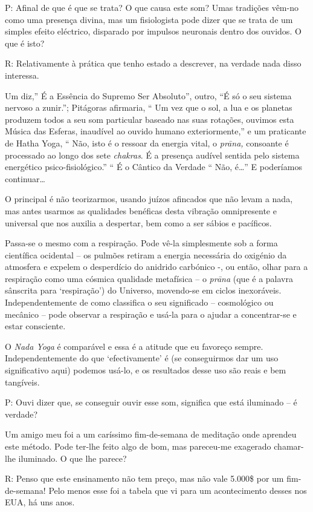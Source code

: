 P: Afinal de que é que se trata? O que causa este som? Umas tradições
vêm-no como uma presença divina, mas um fisiologista pode dizer que se
trata de um simples efeito eléctrico, disparado por impulsos neuronais
dentro dos ouvidos. O que é isto?

R: Relativamente à prática que tenho estado a descrever, na verdade nada
disso interessa.

Um diz,'' É a Essência do Supremo Ser Absoluto'', outro, ``É só o seu
sistema nervoso a zunir.''; Pitágoras afirmaria, `` Um vez que o sol, a
lua e os planetas produzem todos a seu som particular baseado nas suas
rotações, ouvimos esta Música das Esferas, inaudível ao ouvido humano
exteriormente,'' e um praticante de Hatha Yoga, `` Não, isto é o ressoar
da energia vital, o \emph{prāna,} consoante é processado ao longo dos
sete \emph{chakras}. É a presença audível sentida pelo sistema
energético psico-fisiológico.'' `` É o Cântico da Verdade `` Não,
é\ldots{}'' E poderíamos continuar\ldots{}

O principal é não teorizarmos, usando juízos afincados que não levam a
nada, mas antes usarmos as qualidades benéficas desta vibração
omnipresente e universal que nos auxilia a despertar, bem como a ser
sábios e pacíficos.

Passa-se o mesmo com a respiração. Pode vê-la simplesmente sob a forma
científica ocidental -- os pulmões retiram a energia necessária do
oxigénio da atmosfera e expelem o desperdício do anidrido carbónico -,
ou então, olhar para a respiração como uma cósmica qualidade metafísica
-- o \emph{prāna} (que é a palavra sânscrita para `respiração') do
Universo, movendo-se em ciclos inexoráveis. Independentemente de como
classifica o seu significado -- cosmológico ou mecânico -- pode observar
a respiração e usá-la para o ajudar a concentrar-se e estar consciente.

O \emph{Nada Yoga} é comparável e essa é a atitude que eu favoreço
sempre. Independentemente do que `efectivamente' é (se conseguirmos dar
um uso significativo aqui) podemos usá-lo, e os resultados desse uso são
reais e bem tangíveis.

P: Ouvi dizer que, se conseguir ouvir esse som, significa que está
iluminado -- é verdade?

Um amigo meu foi a um caríssimo fim-de-semana de meditação onde aprendeu
este método. Pode ter-lhe feito algo de bom, mas pareceu-me exagerado
chamar-lhe iluminado. O que lhe parece?

R: Penso que este ensinamento não tem preço, mas não vale 5.000\$ por um
fim-de-semana! Pelo menos esse foi a tabela que vi para um acontecimento
desses nos EUA, há uns anos.

